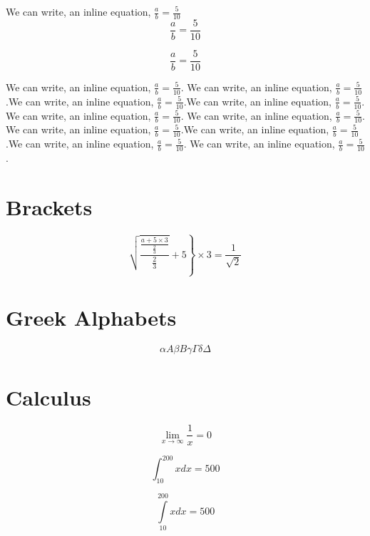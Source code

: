 \documentclass[a4paper, 12pt]{article}
\begin{document}
We can write, an inline equation, $\frac{a}{b} = \frac{5}{10}$
\begin{equation}
    \frac{a}{b} = \frac{5}{10}
\end{equation}


$$\frac{a}{b} = \frac{5}{10}$$

We can write, an inline equation, $\displaystyle \frac{a}{b} = \frac{5}{10}$. We can write, an inline equation,  $\displaystyle\frac{a}{b} = \frac{5}{10}$.We can write, an inline equation, $\frac{a}{b} = \frac{5}{10}$.We can write, an inline equation, $\frac{a}{b} = \frac{5}{10}$. We can write, an inline equation, $\frac{a}{b} = \frac{5}{10}$. We can write, an inline equation, $\frac{a}{b} = \frac{5}{10}$. We can write, an inline equation, $\frac{a}{b} = \frac{5}{10}$.We can write, an inline equation, $\frac{a}{b} = \frac{5}{10}$.We can write, an inline equation, $\frac{a}{b} = \frac{5}{10}$. We can write, an inline equation, $\frac{a}{b} = \frac{5}{10}$.


\section{Brackets}
\begin{equation}
    \left.
    \sqrt{\frac{ \frac{a + 5 \times 3}{ \frac{2}{3} } }{ \frac{2}{3} }} + 5 
    \right\}
    \times 3 = \frac{1}{ \sqrt{2} }
\end{equation}

\section{Greek Alphabets}
\begin{equation}
    \alpha A \beta B \gamma\Gamma\delta\Delta
\end{equation}

\section{Calculus}
\begin{equation}
    \lim_{x \rightarrow \infty} \frac{1}{x} = 0
\end{equation}

\begin{equation}
    \int_{10}^{200} x dx = 500
\end{equation}

\begin{equation}
    \int\limits_{10}^{200} x dx = 500
\end{equation}
\end{document}
